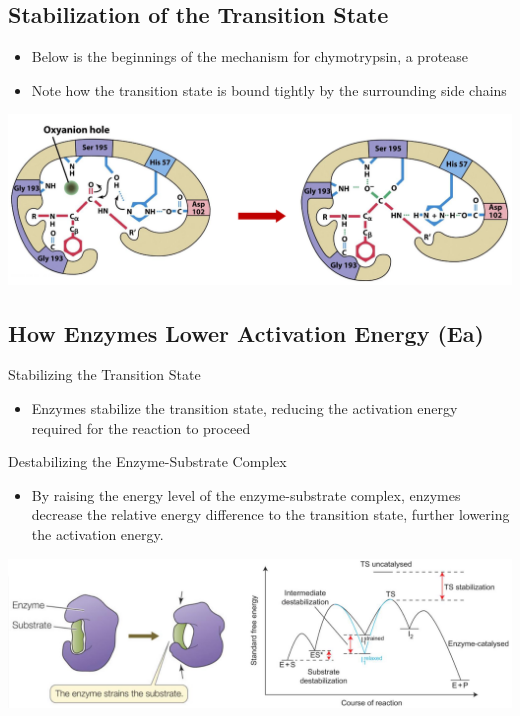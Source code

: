 \documentclass[10pt]{article}
\begin{document}
\subsection*{Stabilization of the Transition State}
\begin{itemize}
    \item Below is the beginnings of the mechanism for chymotrypsin, a protease
    \item Note how the transition state is bound tightly by the surrounding side chains
\end{itemize}
\begin{center}
    \includegraphics*[width=\textwidth]{L1_9.png}
\end{center}

\subsection*{How Enzymes Lower Activation Energy (Ea)}
Stabilizing the Transition State
\begin{itemize}
    \item Enzymes stabilize the transition state, reducing the activation energy required for the reaction to proceed
\end{itemize}
Destabilizing the Enzyme-Substrate Complex
\begin{itemize}
    \item By raising the energy level of the enzyme-substrate complex, enzymes decrease the relative energy difference to the transition state, further lowering the activation energy.
\end{itemize}
\begin{center}
    \includegraphics*[width=\textwidth]{L1_10.png}
\end{center}
\end{document}
